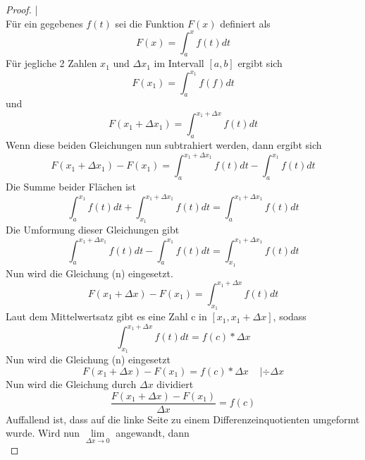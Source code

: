 \documentclass[fontsize=12pt,paper=a4,DIV12,cleardoublepage=empty, 
liststotoc,idxtotoc,bibtotoc]{article}
\theoremstyle{plain}
\theoremstyle{definition}
\begin{document}
	
	\begin{proof}
	
		|\\Für ein gegebenes $f(t)$ sei die Funktion $F(x)$ definiert als
		\begin{equation}
			F(x)=\int_{a}^{x}f(t)dt
		\end{equation}
		Für jegliche 2 Zahlen $x_1$ und $\Delta x_1$ im Intervall $[a, b]$ ergibt sich
		\begin{equation}
			F(x_1)=\int_{a}^{x_1}f(f)dt
		\end{equation}
		und
		\begin{equation}
			F(x_1+\Delta x_1)=\int_{a}^{x_1+\Delta x}f(t)dt
		\end{equation}
		Wenn diese beiden Gleichungen nun subtrahiert werden, dann ergibt sich
		\begin{equation}
			F(x_1+\Delta x_1)-F(x_1)=\int_{a}^{x_1+\Delta x_1}f(t)dt-\int_{a}^{x_1}f(t)dt
		\end{equation}
		Die Summe beider Flächen ist
		\begin{equation}
			\int_{a}^{x_1}f(t)dt + \int_{x_1}^{x_1+\Delta x_1}f(t)dt = \int_{a}^{x_1+\Delta x_1}f(t)dt
		\end{equation}
		Die Umformung dieser Gleichungen gibt
		\begin{equation}
			\int_{a}^{x_1+\Delta x_1}f(t)dt-\int_{a}^{x_1}f(t)dt=\int_{x_1}^{x_1+\Delta x_1}f(t)dt
		\end{equation}
		Nun wird die Gleichung (n) eingesetzt.
		\begin{equation}
			F(x_1+\Delta x)-F(x_1)=\int_{x_1}^{x_1+\Delta x}f(t)dt
		\end{equation}
		Laut dem Mittelwertsatz gibt es eine Zahl c in $[x_1, x_1+\Delta x]$, sodass
		\begin{equation}
			\int_{x_1}^{x_1+\Delta x}f(t)dt=f(c)*\Delta x
		\end{equation}
		Nun wird die Gleichung (n) eingesetzt
		\begin{equation}
			F(x_1+\Delta x)-F(x_1)=f(c)*\Delta x \;\;\;\;|\div \Delta x
		\end{equation}
		Nun wird die Gleichung durch $\Delta x$ dividiert
		\begin{equation}
			\frac{F(x_1+\Delta x)-F(x_1)}{\Delta x}=f(c)
		\end{equation}
		Auffallend ist, dass auf die linke Seite zu einem Differenzeinquotienten umgeformt wurde. Wird nun $\lim \limits_{\Delta x \to 0}$ angewandt, dann
		\begin{equation}

\end{equation}
\end{proof}
\end{document}
